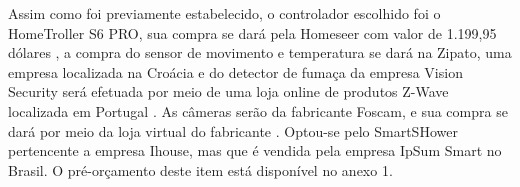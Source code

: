 	Assim como foi previamente estabelecido, o controlador escolhido foi o HomeTroller S6 PRO, sua compra se dará pela Homeseer com valor de 1.199,95 dólares \cite{HomeSeerHomeTroller}, a compra do sensor de movimento e temperatura se dará na Zipato, uma empresa localizada na Croácia e do detector de fumaça da empresa Vision Security será efetuada por meio de uma loja online de produtos Z-Wave localizada em Portugal \cite{ProdutosZwave}. As câmeras serão da fabricante Foscam, e sua compra se dará por meio da loja virtual do fabricante \cite{LojaFoscam}.
	Optou-se pelo SmartSHower pertencente a empresa Ihouse, mas que é vendida pela empresa IpSum Smart no Brasil. O pré-orçamento deste item está disponível no anexo 1. 
































































































